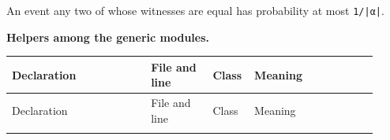 
An event any two of whose witnesses are equal has probability at most \texttt{1/\allowbreak{}|α|}.

\par\medskip\noindent\textbf{Helpers among the generic modules.}

{\footnotesize
\begin{longtable}{@{}>{\raggedright\arraybackslash}p{0.360\linewidth}>{\raggedright\arraybackslash}p{0.160\linewidth}>{\raggedright\arraybackslash}p{0.080\linewidth}>{\raggedright\arraybackslash}p{0.320\linewidth}@{}}
\toprule
Declaration & File and line & Class & Meaning \\
\midrule
\endfirsthead
\toprule
Declaration & File and line & Class & Meaning \\
\midrule
\endhead
\bottomrule
\endfoot

\end{longtable}}
